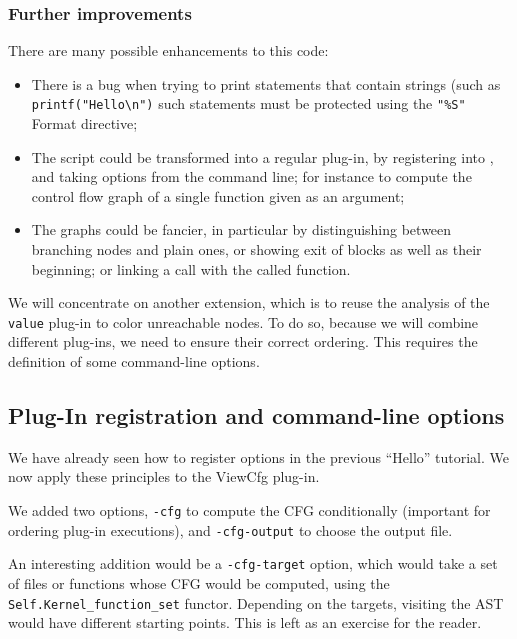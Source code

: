 \subsubsection*{Further improvements}

There are many possible enhancements to this code:

\begin{itemize}
\item There is a bug when trying to print statements that contain
  strings (such as \verb|printf("Hello\n")| such statements must be
  protected using the \verb|"%S"| Format directive;
\item The script could be transformed into a regular plug-in, by
  registering into \framac, and taking options from the command line;
  for instance to compute the control flow graph of a single function
  given as an argument;
\item The graphs could be fancier, in particular by distinguishing
  between branching nodes and plain ones, or showing exit of blocks as
  well as their beginning; or linking a call with the called function.
\end{itemize}

We will concentrate on another extension, which is to reuse the
analysis of the \texttt{value} \framac plug-in to color unreachable
nodes.
To do so, because we will combine different plug-ins, we need to ensure their
correct ordering. This requires the definition of some command-line options.

\subsection{Plug-In registration and command-line options}\label{tut2:options}

We have already seen how to register options in the previous ``Hello'' tutorial.
We now apply these principles to the ViewCfg plug-in.


We added two options, \texttt{-cfg} to compute the CFG
conditionally (important for ordering plug-in executions),
and \texttt{-cfg-output} to choose the output file.

An interesting addition would be a \texttt{-cfg-target} option,
which would take a set of files or functions whose CFG would be
computed, using the \texttt{Self.Kernel\_function\_set} functor. Depending on
the targets, visiting the AST would have different starting points.
This is left as an exercise for the reader.

